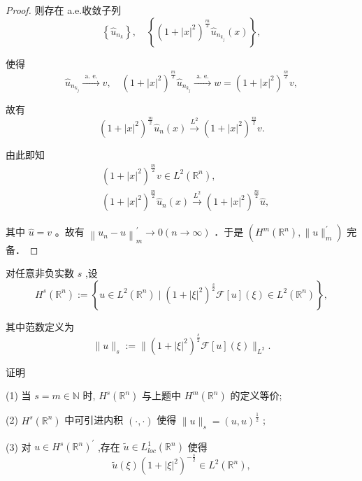\documentclass[lang=cn,newtx,10pt,scheme=chinese,thmcnt=chapter]{elegantbook}
\begin{document}
\begin{problemset}
\begin{proof}
则存在 a.e.收敛子列
$$
\left\{\hat{u}_{n_k}\right\}, \quad\left\{\left(1+|x|^2\right)^{\frac{m}{2}} \hat{u}_{n_{k_j}}(x)\right\},
$$


使得
$$
\hat{u}_{n_{k_j}} \xrightarrow{\text { a. e. }} v, \quad\left(1+|x|^2\right)^{\frac{m}{2}} \hat{u}_{n_{k_j}} \xrightarrow{\text { a. e. }} w=\left(1+|x|^2\right)^{\frac{m}{2}} v,
$$

故有
$$
\left(1+|x|^2\right)^{\frac{m}{2}} \hat{u}_n(x) \xrightarrow{L^2}\left(1+|x|^2\right)^{\frac{m}{2}} v .
$$

由此即知
$$
\begin{aligned}
& \left(1+|x|^2\right)^{\frac{m}{2}} v \in L^2\left(\mathbb{R}^n\right), \\
& \left(1+|x|^2\right)^{\frac{m}{2}} \hat{u}_n(x) \xrightarrow{L^2}\left(1+|x|^2\right)^{\frac{m}{2}} \hat{u},
\end{aligned}
$$

其中 $\hat{u}=v$ 。故有 $\left\|u_n-u\right\|_m^{\prime} \rightarrow 0(n \rightarrow \infty)$ ．于是 $\left(H^m\left(\mathbb{R}^n\right),\|u\|_m^{\prime}\right)$ 完备．
\end{proof}
\item 对任意非负实数 \(s\) ,设
\begin{equation*}
{H}^{s}\left( {\mathbb{R}}^{n}\right)  \mathrel{\text{ := }} \left\{  {u \in  {L}^{2}\left( {\mathbb{R}}^{n}\right)  \mid  {\left( 1 + {\left| \xi \right| }^{2}\right) }^{\frac{s}{2}}\mathcal{F}\left\lbrack  u\right\rbrack  \left( \xi \right)  \in  {L}^{2}\left( {\mathbb{R}}^{n}\right) }\right\}  ,
\end{equation*}

其中范数定义为
\begin{equation*}
\parallel u{\parallel }_{s} \mathrel{\text{ := }} \parallel {\left( 1 + {\left| \xi \right| }^{2}\right) }^{\frac{s}{2}}\mathcal{F}\left\lbrack  u\right\rbrack  \left( \xi \right) {\parallel }_{{L}^{2}}.
\end{equation*}

证明

(1) 当 \(s = m \in  \mathbb{N}\) 时, \({H}^{s}\left( {\mathbb{R}}^{n}\right)\) 与上题中 \({H}^{m}\left( {\mathbb{R}}^{n}\right)\) 的定义等价;

(2) \({H}^{s}\left( {\mathbb{R}}^{n}\right)\) 中可引进内积 \(\left( {\cdot , \cdot  }\right)\) 使得 \(\parallel u{\parallel }_{s} = {\left( u,u\right) }^{\frac{1}{2}}\) ;

(3) 对 \(u \in  {H}^{s}{\left( {\mathbb{R}}^{n}\right) }^{\prime }\) ,存在 \(\widetilde{u} \in  {L}_{loc}^{1}\left( {\mathbb{R}}^{n}\right)\) 使得
\begin{equation*}
\widetilde{u}\left( \xi \right) {\left( 1 + {\left| \xi \right| }^{2}\right) }^{-\frac{s}{2}} \in  {L}^{2}\left( {\mathbb{R}}^{n}\right) ,
\end{equation*}


\end{problemset}
\end{document}
